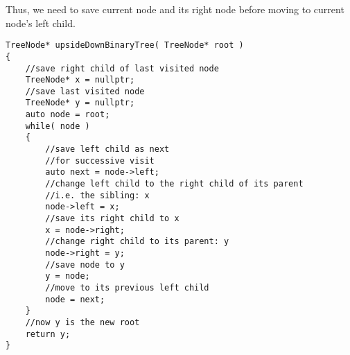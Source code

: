 Thus, we need to save current node and its right node before moving to current node's left child.


\begin{lstlisting}[style=customc, caption={Iterative}]
TreeNode* upsideDownBinaryTree( TreeNode* root )
{
    //save right child of last visited node
    TreeNode* x = nullptr;
    //save last visited node
    TreeNode* y = nullptr;
    auto node = root;
    while( node )
    {
        //save left child as next
        //for successive visit
        auto next = node->left;
        //change left child to the right child of its parent
        //i.e. the sibling: x
        node->left = x;
        //save its right child to x
        x = node->right;
        //change right child to its parent: y
        node->right = y;
        //save node to y
        y = node;
        //move to its previous left child
        node = next;
    }
    //now y is the new root
    return y;
}
\end{lstlisting}

